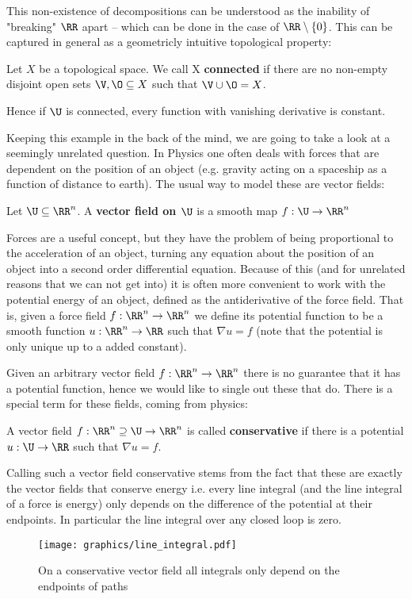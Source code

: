 This non-existence of decompositions can be understood as the inability of "breaking" $\RR$ apart – which can
be done in the case of $\RR \setminus \{0\}$. This can be captured in general as a geometricly intuitive
topological property:
\begin{definition}
	Let $X$ be a topological space. We call X \textbf{connected} if there are no non-empty
	disjoint open sets $\V, \O \subseteq X$ such that $\V \cup \O = X$.
\end{definition}
Hence if $\U$ is connected, every function with vanishing derivative is constant.

Keeping this example in the back of the mind, we are going to take a look at a seemingly unrelated
question. In Physics one often deals with forces that are dependent on the position of an object (e.g. gravity
acting on a spaceship as a function of distance to earth). The usual way to model these are vector fields:
\begin{definition}
Let $\U \subseteq \RR^n$. A \textbf{vector field on $\U$} is a smooth map $f: \U \to \RR^n$
\end{definition}

Forces are a useful concept, but they have the problem of being proportional to the acceleration
of an object, turning any equation about the position of an object into a second order differential
equation. Because of this (and for unrelated reasons that we can not get into) it is often more convenient
to work with the potential energy of an object, defined as the antiderivative of the force field. That is,
given a  force field $f: \RR^n \to \RR^n$ we define its potential function to be a smooth function $u: \RR^n \to \RR$
such that $\nabla u = f$ (note that the potential is only unique up to a added constant).

Given an arbitrary vector field $f: \RR^n \to \RR^n$ there is no guarantee that it has a potential function, hence we would like to
single out these that do. There is a special term for these fields, coming from physics:
\begin{definition}
A vector field $f: \RR^n \supseteq \U \to \RR^n$ is called \textbf{conservative} if there is a potential $u: \U \to \RR$
such that $\nabla u = f$.
\end{definition}
Calling such a vector field conservative stems from the fact that these are exactly the vector
fields that conserve energy i.e. every line integral (and the line integral of a force is
energy) only depends on the difference of the potential at their endpoints.
In particular the line integral over any closed loop is zero.
\begin{figure}
	\centering
	\texttt{[image: graphics/line\_integral.pdf]}
	\caption{On a conservative vector field all integrals only depend on the endpoints of paths}
\end{figure}


